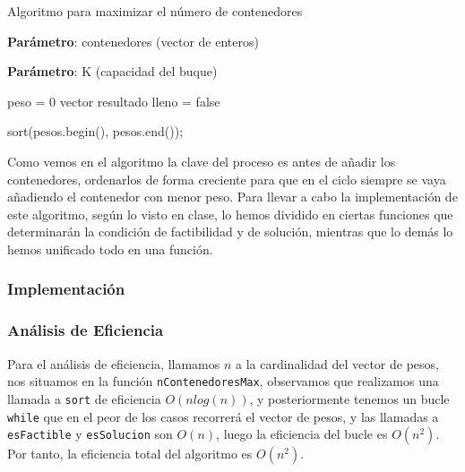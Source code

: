 \begin{algorithm}[H]
    \caption{Algoritmo para maximizar el número de contenedores}\label{alg:max_containers}
    \begin{minipage}{0.92\textwidth}
    \textbf{Parámetro}: contenedores (vector de enteros)

    \textbf{Parámetro}: K (capacidad del buque)

    \end{minipage}

    peso = 0\;
    vector resultado\;
    lleno = false\;

    sort(pesos.begin(), pesos.end());

     {
    }

    
\end{algorithm}

Como vemos en el algoritmo la clave del proceso es antes de añadir los contenedores, ordenarlos de forma creciente para que 
en el ciclo siempre se vaya añadiendo el contenedor con menor peso. 
Para llevar a cabo la implementación de este algoritmo, según lo visto en clase, lo hemos dividido en ciertas funciones que 
determinarán la condición de factibilidad y de solución, mientras que lo demás lo hemos unificado todo en una función. 

\subsubsection{Implementación}



\subsubsection{Análisis de Eficiencia}

Para el análisis de eficiencia, llamamos $n$ a la cardinalidad del vector de pesos, nos situamos en la función \texttt{nContenedoresMax}, observamos que realizamos una llamada a \texttt{sort} de eficiencia $O(nlog(n))$, y posteriormente tenemos un bucle \texttt{while} que en el peor de los casos recorrerá el vector de pesos, y las llamadas a \texttt{esFactible} y \texttt{esSolucion} son $O(n)$, luego la eficiencia del bucle es $O(n^2)$. Por tanto, la eficiencia total del algoritmo es $O(n^2)$.

